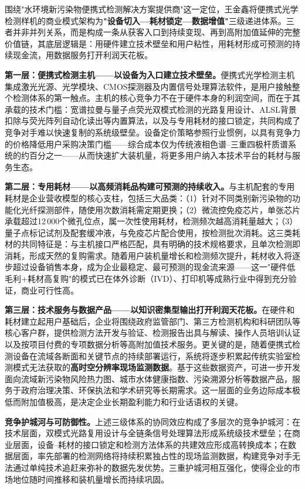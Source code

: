\documentclass[12pt,a4paper]{article}
\begin{document}
围绕"水环境新污染物便携式检测解决方案提供商"这一定位，王金鑫将便携式光学检测样机的商业模式架构为\textbf{"设备切入—耗材锁定—数据增值"}三级递进体系。三者并非并列关系，而是构成一条从获客入口到持续变现、再到高附加值延伸的完整价值链，其底层逻辑是：用硬件建立技术壁垒和用户粘性，用耗材形成可预测的持续现金流，用数据服务打开利润天花板。

\textbf{第一层：便携式检测主机——以设备为入口建立技术壁垒。}便携式光学检测主机集成激光光源、光学模块、CMOS探测器及内置信号处理算法软件，是用户接触整个检测体系的第一触点。主机的核心竞争力不在于硬件本身的利润空间，而在于其承载的技术门槛：宽谱拉曼与量子点荧光双模式检测的光路复用设计、ALSL背景扣除与荧光阵列自动化读出等内置算法，以及与专用耗材的接口锁定，共同构成了竞争对手难以快速复制的系统级壁垒。设备定价策略参照行业惯例，以具有竞争力的价格降低用户采购决策门槛——综合成本仅为传统液相色谱--三重四极杆质谱系统的约百分之一——从而快速扩大装机量，将更多用户纳入本技术平台的耗材与服务生态。

\textbf{第二层：专用耗材——以高频消耗品构建可预测的持续收入。}与主机配套的专用耗材是企业营收模型的核心支柱，包括三大品类：（1）针对不同类别新污染物的功能化光纤探测部件，随使用次数消耗需定期更换；（2）微流控免疫芯片，单张芯片承载超过12\,000个微孔位点，属一次性使用耗材，检测频次越高消耗量越大；（3）量子点标记试剂及配套缓冲液，与免疫芯片配合使用，按检测批次消耗。这三类耗材的共同特征是：与主机接口严格匹配，具有明确的技术规格要求，且单次检测即消耗，形成天然的复购需求。随着用户装机量增长和检测频次提升，耗材收入将逐步超过设备销售本身，成为企业最稳定、最可预测的现金流来源——这一"硬件低毛利+耗材高复购"的模式已在体外诊断（IVD）、打印机等成熟行业中得到充分验证，商业可行性高。

\textbf{第三层：技术服务与数据产品——以知识密集型输出打开利润天花板。}在硬件和耗材建立起用户基础后，企业将围绕政府监管部门、第三方检测机构和科研团队等核心客户群，提供检测方法开发与验证、检测报告出具与解读、操作人员培训认证以及按项目付费的专项数据分析等高附加值技术服务。更关键的是，随着便携式检测设备在流域各断面和关键节点的持续部署运行，系统将逐步积累起传统实验室检测模式无法获取的\textbf{高时空分辨率现场监测数据}。基于这些数据资产，可进一步开发面向流域新污染物风险热力图、城市水体健康指数、污染溯源分析等数据产品，服务于政府治理决策、环保执法和学术研究等长期需求。这一层面的业务边际成本极低而附加值极高，是决定企业长期盈利能力和行业话语权的关键。

\textbf{竞争护城河与可防御性。}上述三级体系的协同效应构成了多层次的竞争护城河：在技术层面，双模式光路复用设计与全链条信号处理算法形成系统级技术壁垒；在商业层面，设备--耗材的接口锁定和检测方法体系的共建效应形成高转换成本；在数据层面，率先部署的检测网络将持续积累独占性的现场监测数据，构建竞争对手无法通过单纯技术追赶来弥补的数据先发优势。三重护城河相互强化，使得企业的市场地位随时间推移和装机量增长而持续巩固。
\end{document}
